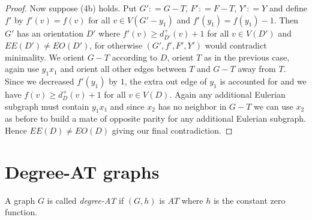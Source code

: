 \documentclass[12pt]{article}
\theoremstyle{plain}
\theoremstyle{definition}
\theoremstyle{remark}
\newcommand{\parens}[1]{\left( #1 \right)}
\newcommand{\DefinedAs}{\mathrel{\mathop:}=}
\begin{document}
\begin{proof}
	Now suppose (4b) holds.  Put $G' \DefinedAs G - T$, $F' \DefinedAs F - T$, $Y' \DefinedAs Y$ and define $f'$ by $f'(v) = f(v)$ for all $v \in V(G'-y_1)$ and $f'(y_1) = f(y_1) - 1$.  Then $G'$ has an orientation $D'$ where $f'(v) \ge d_{D'}^+(v) + 1$ for all $v \in V(D')$ and $EE(D') \ne EO(D')$, for otherwise $\parens{G', f', F', Y'}$ would contradict minimality.  We orient $G - T$ according to $D$, orient $T$ as in the previous case, again use $y_1x_1$ and orient all other edges between $T$ and $G-T$ away from $T$.  Since we decreased $f'(y_1)$ by $1$, the extra out edge of $y_1$ is accounted for and we have $f(v) \ge d_{D}^+(v) + 1$ for all $v \in V(D)$.  Again any additional Eulerian subgraph must contain $y_1x_1$ and since $x_2$ has no neighbor in $G-T$ we can use $x_2$ as before to build a mate of opposite parity for any additional Eulerian subgraph.  Hence $EE(D) \ne EO(D)$ giving our final contradiction.
\end{proof}

\section{Degree-AT graphs}
A graph $G$ is called \emph{degree-AT} if $(G,h)$ is $AT$ where $h$ is the constant zero function.
\end{document}
